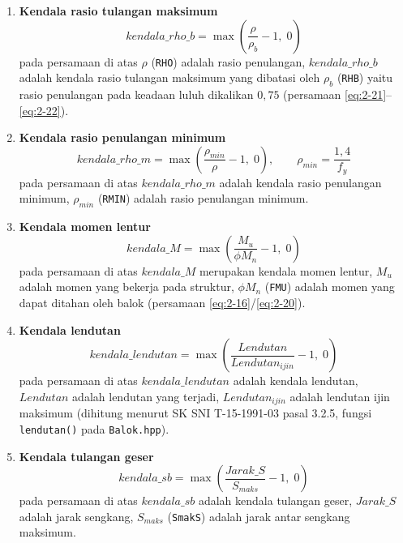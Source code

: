\begin{enumerate}[label=\arabic*.]
\item \textbf{Kendala rasio tulangan maksimum}
\begin{equation}
\mathit{kendala\_rho\_b} = \max\!\left(\frac{\rho}{\rho_b} - 1,\; 0\right)
\label{eq:3-1}
\end{equation}
pada persamaan di atas $\rho$ (\texttt{RHO}) adalah rasio penulangan,
$\mathit{kendala\_rho\_b}$ adalah kendala rasio tulangan maksimum yang
dibatasi oleh $\rho_b$ (\texttt{RHB}) yaitu rasio penulangan pada keadaan
luluh dikalikan $0{,}75$ (persamaan \eqref{eq:2-21}--\eqref{eq:2-22}).

\item \textbf{Kendala rasio penulangan minimum}
\begin{equation}
\mathit{kendala\_rho\_m} = \max\!\left(\frac{\rho_{min}}{\rho} - 1,\; 0\right),
\qquad \rho_{min} = \frac{1{,}4}{f_y}
\label{eq:3-2}
\end{equation}
pada persamaan di atas $\mathit{kendala\_rho\_m}$ adalah kendala rasio
penulangan minimum, $\rho_{min}$ (\texttt{RMIN}) adalah rasio penulangan
minimum.

\item \textbf{Kendala momen lentur}
\begin{equation}
\mathit{kendala\_M} = \max\!\left(\frac{M_u}{\phi M_n} - 1,\; 0\right)
\label{eq:3-3}
\end{equation}
pada persamaan di atas $\mathit{kendala\_M}$ merupakan kendala momen
lentur, $M_u$ adalah momen yang bekerja pada struktur, $\phi M_n$
(\texttt{FMU}) adalah momen yang dapat ditahan oleh balok (persamaan
\eqref{eq:2-16}/\eqref{eq:2-20}).

\item \textbf{Kendala lendutan}
\begin{equation}
\mathit{kendala\_lendutan} = \max\!\left(\frac{\mathit{Lendutan}}{\mathit{Lendutan}_{ijin}} - 1,\; 0\right)
\label{eq:3-4}
\end{equation}
pada persamaan di atas $\mathit{kendala\_lendutan}$ adalah kendala
lendutan, $\mathit{Lendutan}$ adalah lendutan yang terjadi,
$\mathit{Lendutan}_{ijin}$ adalah lendutan ijin maksimum (dihitung
menurut SK SNI T-15-1991-03 pasal 3.2.5, fungsi \texttt{lendutan()} pada
\texttt{Balok.hpp}).

\item \textbf{Kendala tulangan geser}
\begin{equation}
\mathit{kendala\_sb} = \max\!\left(\frac{Jarak\_S}{S_{maks}} - 1,\; 0\right)
\label{eq:3-5}
\end{equation}
pada persamaan di atas $\mathit{kendala\_sb}$ adalah kendala tulangan
geser, $Jarak\_S$ adalah jarak sengkang, $S_{maks}$ (\texttt{SmakS})
adalah jarak antar sengkang maksimum.
\end{enumerate}


